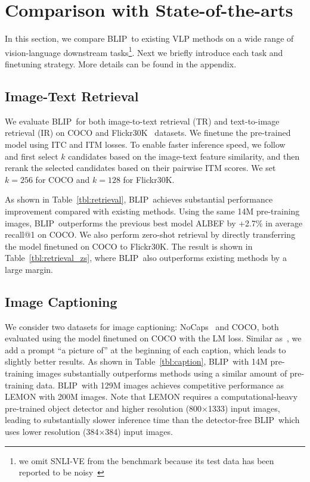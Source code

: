 \section{Comparison with State-of-the-arts}
\label{sec:downstream}

In this section, we compare BLIP~to existing VLP methods on a wide range of vision-language downstream tasks\footnote{we omit SNLI-VE from the benchmark because its test data has been reported to be noisy~\cite{ve-2.0}}. Next we briefly introduce each task and finetuning strategy. More details can be found in the appendix.

\subsection{Image-Text Retrieval}

We evaluate BLIP~for both image-to-text retrieval (TR) and text-to-image retrieval (IR) on COCO and Flickr30K~\cite{flickr} datasets. We finetune the pre-trained model using ITC and ITM losses. To enable faster inference speed, we follow~\citet{ALBEF} and first select $k$ candidates based on the image-text feature similarity, and then rerank the selected candidates based on their pairwise ITM scores. We set $k=256$ for COCO and $k=128$ for Flickr30K.

As shown in Table~\ref{tbl:retrieval},
BLIP~achieves substantial performance improvement compared with existing methods. Using the same 14M pre-training images, BLIP~outperforms the previous best model ALBEF by +2.7\% in average recall@1 on COCO. We also perform zero-shot retrieval by directly transferring the model finetuned on COCO to Flickr30K. The result is shown in Table~\ref{tbl:retrieval_zs},
where BLIP~also outperforms existing methods by a large margin.

\subsection{Image Captioning}

We consider two datasets for image captioning: NoCaps~\cite{nocaps} and COCO, both evaluated using the model finetuned on COCO with the LM loss. Similar as~\citet{simvlm},
we add a prompt ``a picture of'' at the beginning of each caption, which leads to slightly better results. As shown in Table~\ref{tbl:caption},
BLIP~with 14M pre-training images substantially outperforms methods using a similar amount of pre-training data. BLIP~with 129M images achieves competitive performance as LEMON with 200M images. Note that LEMON requires a computational-heavy pre-trained object detector and higher resolution (800$\times$1333) input images, leading to substantially slower inference time than the detector-free BLIP~which uses lower resolution (384$\times$384) input images.

